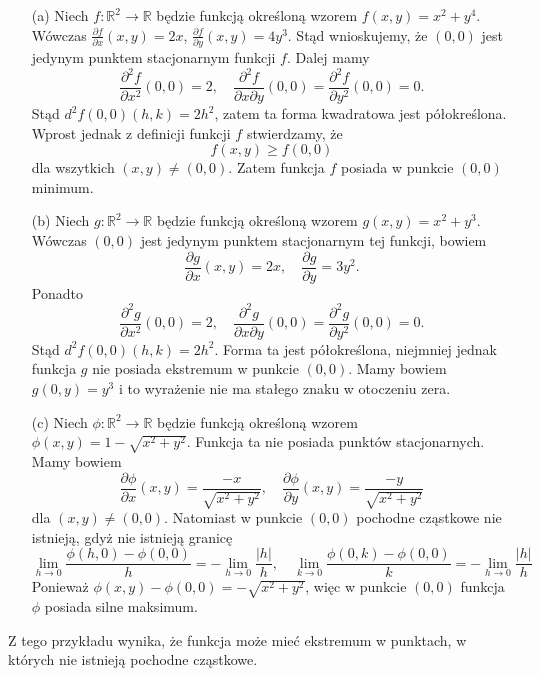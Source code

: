 \documentclass[leqno]{article}
\begin{document}
\begin{justify}
\begin{ex}
    \begin{itemize}
        \item [(a)] Niech $f : \mathbb{R}^2 \to \mathbb{R}$ będzie funkcją określoną wzorem $f(x,y) = x^2 + y^4$. Wówczas $\frac{\partial f}{\partial x}(x,y)=2x$,
            $\frac{\partial f}{\partial y}(x,y) = 4y^3$. Stąd wnioskujemy, że $(0,0)$ jest jedynym punktem stacjonarnym funkcji $f$. Dalej mamy 
            \[
                \frac{\partial ^2 f}{\partial x^2}(0,0) = 2, \quad \frac{\partial ^2 f}{\partial x \partial y}(0,0) = \frac{\partial ^2 f}{\partial y^2}(0,0) = 0.
            \]
            Stąd $d^2f(0,0)(h,k) = 2h^2$, zatem ta forma kwadratowa jest półokreślona. Wprost jednak z definicji funkcji $f$ stwierdzamy, że 
            \[
                f(x,y) \geqslant f(0,0)
            \]
            dla wszytkich $(x,y) \neq (0,0)$. Zatem funkcja $f$ posiada w punkcie $(0,0)$ minimum.
        \item [(b)]
            Niech $g : \mathbb{R}^2 \to \mathbb{R}$ będzie funkcją określoną wzorem $g(x,y) = x^2 + y^3$. Wówczas
            $(0,0)$ jest jedynym punktem stacjonarnym tej funkcji, bowiem 
            \[
                \frac{\partial g}{\partial x}(x,y) = 2x, \quad \frac{\partial g}{\partial y}=3y^2.
            \]
            Ponadto
            \[
                \frac{\partial ^2 g}{\partial x^2}(0,0) = 2, \quad \frac{\partial ^2 g}{\partial x \partial y}(0,0) = \frac{\partial ^2 g}{\partial y^2}(0,0) = 0.
            \]
            Stąd $d^2 f(0,0)(h,k) = 2h^2$. Forma ta jest półokreślona, niejmniej jednak funkcja $g$ nie posiada ekstremum w punkcie $(0,0)$. Mamy bowiem $g(0, y) = y^3$
            i to wyrażenie nie ma stałego znaku w otoczeniu zera. 
        \item [(c)]
            Niech $\phi : \mathbb{R}^2 \to \mathbb{R}$ będzie funkcją określoną wzorem $\phi(x,y) = 1 - \sqrt{x^2 + y^2}$. Funkcja ta nie posiada punktów stacjonarnych. Mamy bowiem 
            \[
                \frac{\partial \phi }{\partial x}(x,y) = \frac{-x}{\sqrt{x^2 + y^2}}, \quad \frac{\partial \phi}{\partial y}(x,y) = \frac{-y}{\sqrt{x^2 + y^2}}
            \]
            dla $(x,y) \neq (0,0)$. Natomiast w punkcie $(0,0)$ pochodne cząstkowe nie istnieją, gdyż nie istnieją granicę 
            \[
                \lim_{h \to 0}\frac{\phi(h, 0) - \phi(0,0)}{h} = - \lim_{h \to 0}\frac{|h|}{h}, \quad \lim_{k \to 0}\frac{\phi(0, k) - \phi(0,0)}{k} = - \lim_{h \to 0}\frac{|h|}{h}
            \]
            Ponieważ $\phi(x,y) - \phi(0,0) = -\sqrt{x^2 + y^2}$, więc w punkcie $(0,0)$ funkcja $\phi$ posiada silne maksimum.
    \end{itemize}
    Z tego przykładu wynika, że funkcja może mieć ekstremum w punktach, w których nie istnieją pochodne cząstkowe. 
\end{ex}


\end{justify}
\end{document}
